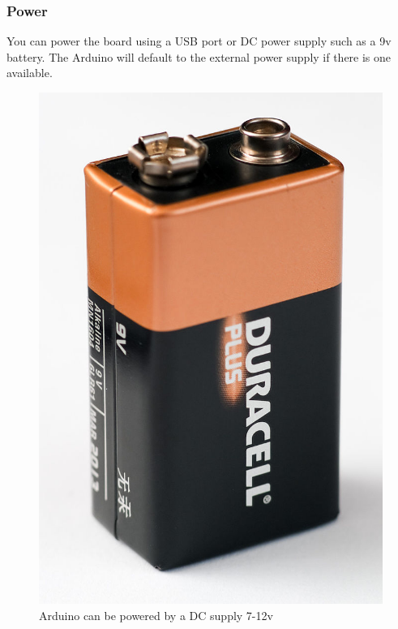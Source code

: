 \begin{frame}
  \frametitle{Power}
	You can power the board using a USB port or DC power supply such as a 9v battery. The Arduino will default to the external power supply if there is one available.   
	\begin{figure}
		\includegraphics[scale=.1]{assets/battery} 
		\caption{Arduino can be powered by a DC supply 7-12v}
	\end{figure}
\end{frame}

